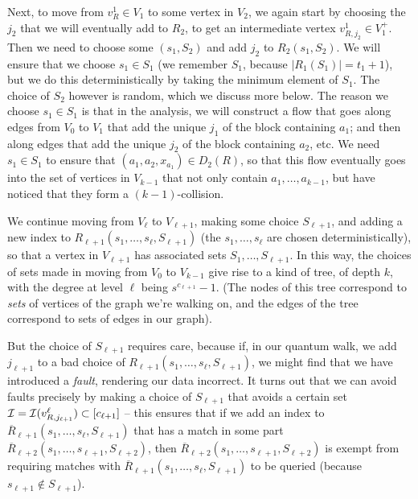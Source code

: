 \documentclass{theoretics}
\renewcommand{\>}{\rangle}
\newcommand{\<}{\langle}
\renewcommand{\(}{\left(}
\renewcommand{\)}{\right)}
\begin{document}
Next, to move from $v_R^1\in V_1$ to some vertex in $V_2$, we again start by choosing the $j_2$ that we will eventually add to $R_2$, to get an intermediate vertex $v_{R,j_2}^1\in V_1^+$. Then we need to choose some $(s_1,S_2)$ and add $j_2$ to $R_2(s_1,S_2)$. We will ensure that we choose $s_1\in S_1$ (we remember $S_1$, because $|R_1(S_1)|=t_1+1$), but we do this deterministically by taking the minimum element of $S_1$. The choice of $S_2$ however is random, which we discuss more below. The reason we choose $s_1\in S_1$ is that in the analysis, we will construct a flow that goes along edges from $V_0$ to $V_1$ that add the unique $j_1$ of the block containing $a_1$; and then along edges that add the unique $j_2$ of the block containing $a_2$, etc. We need $s_1\in S_1$ to ensure that $(a_1,a_2,x_{a_1})\in D_2(R)$, so that this flow eventually goes into the set of vertices in $V_{k-1}$ that not only contain $a_1,\dots,a_{k-1}$, but have noticed that they form a $(k-1)$-collision. 

We continue moving from $V_{\ell}$ to $V_{\ell+1}$, making some choice $S_{\ell+1}$, and adding a new index to $R_{\ell+1}(s_1,\dots,s_{\ell},S_{\ell+1})$ (the $s_1,\dots,s_{\ell}$ are chosen deterministically), so that a vertex in $V_{\ell+1}$ has associated sets $S_1,\dots,S_{\ell+1}$. 
In this way, the choices of sets made in moving from $V_0$ to $V_{k-1}$ give rise to a kind of tree, of depth $k$, with the degree at level $\ell$ being $s^{c_{\ell+1}}-1$. (The nodes of this tree correspond to \emph{sets} of vertices of the graph we're walking on, and the edges of the tree correspond to sets of edges in our graph).

But the choice of $S_{\ell+1}$ requires care, because if, in our quantum walk, we add $j_{\ell+1}$ to a bad choice of $R_{\ell+1}(s_1,\dots,s_{\ell},S_{\ell+1})$, we might find that we have introduced a \emph{fault}, rendering our data incorrect. It turns out that we can avoid faults precisely by making a choice of ${S}_{\ell+1}$ that avoids a certain set ${\cal I}={\cal I}(v_{R,j_{\ell+1}}^{\ell})\subset [c_{\ell+1}]$ -- this ensures that if we add an index to $\overline{R}_{\ell+1}(s_1,\dots,s_{\ell},S_{\ell+1})$ that has a match in some part $\overline{R}_{\ell+2}(s_1,\dots,s_{\ell+1},S_{\ell+2})$, then $\overline{R}_{\ell+2}(s_1,\dots,s_{\ell+1},S_{\ell+2})$ is exempt from requiring matches with $\overline{R}_{\ell+1}(s_1,\dots,s_{\ell},S_{\ell+1})$ to be queried (because $s_{\ell+1}\not\in S_{\ell+1}$). 
\end{document}
